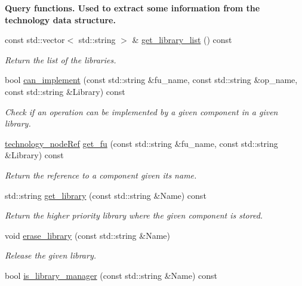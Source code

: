 \begin{Indent}\textbf{ Query functions. Used to extract some information from the technology data structure.}\par
\begin{DoxyCompactItemize}
\item 
const std\+::vector$<$ std\+::string $>$ \& \hyperlink{classtechnology__manager_a627c7ca63f6fd50d575f5ebffcec34a2}{get\+\_\+library\+\_\+list} () const
\begin{DoxyCompactList}\small\item\em Return the list of the libraries. \end{DoxyCompactList}\item 
bool \hyperlink{classtechnology__manager_ae2841df8f1c076ccb3ba874e271fc7a5}{can\+\_\+implement} (const std\+::string \&fu\+\_\+name, const std\+::string \&op\+\_\+name, const std\+::string \&Library) const
\begin{DoxyCompactList}\small\item\em Check if an operation can be implemented by a given component in a given library. \end{DoxyCompactList}\item 
\hyperlink{technology__node_8hpp_a33dd193b7bd6b987bf0d8a770a819fa7}{technology\+\_\+node\+Ref} \hyperlink{classtechnology__manager_ad77d7800d227bbb41c5206d4c2f30260}{get\+\_\+fu} (const std\+::string \&fu\+\_\+name, const std\+::string \&Library) const
\begin{DoxyCompactList}\small\item\em Return the reference to a component given its name. \end{DoxyCompactList}\item 
std\+::string \hyperlink{classtechnology__manager_a6197597d8ed453fe9f989f94a59429ef}{get\+\_\+library} (const std\+::string \&Name) const
\begin{DoxyCompactList}\small\item\em Return the higher priority library where the given component is stored. \end{DoxyCompactList}\item 
void \hyperlink{classtechnology__manager_a17d5f85564ae7e7578966d0875ce9444}{erase\+\_\+library} (const std\+::string \&Name)
\begin{DoxyCompactList}\small\item\em Release the given library. \end{DoxyCompactList}\item 
bool \hyperlink{classtechnology__manager_ae07845b64a58c7b505ee7efe03f5c220}{is\+\_\+library\+\_\+manager} (const std\+::string \&Name) const

\end{DoxyCompactItemize}
\end{Indent}

